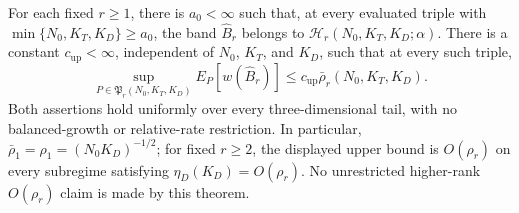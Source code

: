For each fixed \(r\ge1\), there is \(a_0<\infty\) such that, at every evaluated triple with \(\min\{N_0,K_T,K_D\}\ge a_0\), the band \(\widehat B_r\) belongs to \(\mathcal H_r(N_0,K_T,K_D;\alpha)\). There is a constant \(c_{\mathrm{up}}<\infty\), independent of \(N_0\), \(K_T\), and \(K_D\), such that at every such triple,
\[
 \sup_{P\in\mathfrak P_r(N_0,K_T,K_D)}E_P[w(\widehat B_r)]
 \le c_{\mathrm{up}}\bar\rho_r(N_0,K_T,K_D).
\]
Both assertions hold uniformly over every three-dimensional tail, with no balanced-growth or relative-rate restriction. In particular, \(\bar\rho_1=\rho_1=(N_0K_D)^{-1/2}\); for fixed \(r\ge2\), the displayed upper bound is \(O(\rho_r)\) on every subregime satisfying \(\eta_D(K_D)=O(\rho_r)\). No unrestricted higher-rank \(O(\rho_r)\) claim is made by this theorem.